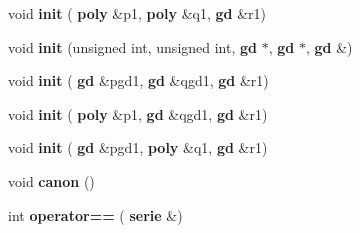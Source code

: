 \begin{DoxyCompactItemize}
\mbox{\label{classmmgd_1_1mmgd_1_1serie_a3ec7bfdba701b17e56c055e0a9486b6e}} 
void {\bfseries init} (\textbf{ poly} \&p1, \textbf{ poly} \&q1, \textbf{ gd} \&r1)
\item 
\mbox{\label{classmmgd_1_1mmgd_1_1serie_ac01a3e0aea64486c264500293c6313d6}} 
void {\bfseries init} (unsigned int, unsigned int, \textbf{ gd} $\ast$, \textbf{ gd} $\ast$, \textbf{ gd} \&)
\item 
\mbox{\label{classmmgd_1_1mmgd_1_1serie_a15d0c0636e2cf65ee8af81def95d0242}} 
void {\bfseries init} (\textbf{ gd} \&pgd1, \textbf{ gd} \&qgd1, \textbf{ gd} \&r1)
\item 
\mbox{\label{classmmgd_1_1mmgd_1_1serie_a1485f36c62d4a6d3c5861c12219d28e2}} 
void {\bfseries init} (\textbf{ poly} \&p1, \textbf{ gd} \&qgd1, \textbf{ gd} \&r1)
\item 
\mbox{\label{classmmgd_1_1mmgd_1_1serie_a63454c770de7d4ee7f0216c21183574b}} 
void {\bfseries init} (\textbf{ gd} \&pgd1, \textbf{ poly} \&q1, \textbf{ gd} \&r1)
\item 
\mbox{\label{classmmgd_1_1mmgd_1_1serie_a37939ffcb52ec8f82a45c54e34b8d3fe}} 
void {\bfseries canon} ()
\item 
\mbox{\label{classmmgd_1_1mmgd_1_1serie_a1d28f3f8c8f4a4f5e7b3cf17102faf25}} 
int {\bfseries operator==} (\textbf{ serie} \&)
\end{DoxyCompactItemize}
